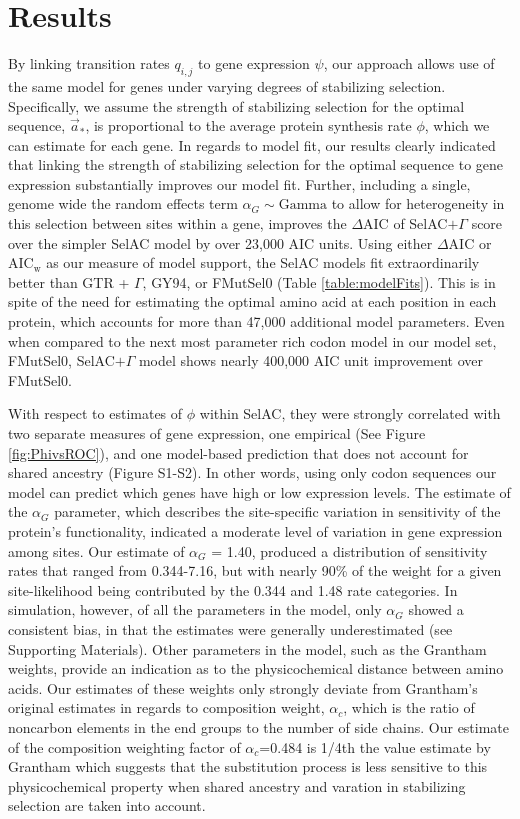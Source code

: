 \documentclass{article}
\newcommand{\DeltaAIC}{\ensuremath{\Delta\text{AIC}}\xspace}
\newcommand{\AICw}{\ensuremath{\text{AIC}_\text{w}}\xspace}
\newcommand{\selac}{SelAC\xspace}
\newcommand{\selacplusgamma}{SelAC$+\Gamma$\xspace}
\newcommand{\alphac}{\ensuremath{\alpha_c}\xspace}
\newcommand{\alphag}{\ensuremath{\alpha_G}\xspace}
\newcommand{\aoptvec}{\ensuremath{\Vec{a}_*}\xspace}
\newcommand{\qij}{\ensuremath{q_{i,j}}\xspace}
\begin{document}
\section*{Results}
By linking transition rates $\qij$ to gene expression $\psi$, our approach allows use of the same model for genes under varying degrees of stabilizing selection.
Specifically, we assume the strength of stabilizing selection for the optimal sequence, \aoptvec, is proportional to the average protein synthesis rate $\phi$, which we can estimate for each gene. 
In regards to model fit, our results clearly indicated that linking the strength of stabilizing selection for the optimal sequence to gene expression substantially improves our model fit.
Further, including a single, genome wide the random effects term $\alphag \sim \text{Gamma}$ to allow for heterogeneity in this selection between sites within a gene, improves the \DeltaAIC of \selacplusgamma score over the simpler \selac model by over 23,000 AIC units.
Using either \DeltaAIC or \AICw as our measure of model support, the \selac models fit extraordinarily better than GTR + $\Gamma$, GY94, or FMutSel0 (Table \ref{table:modelFits}).
This is in spite of the need for estimating the optimal amino acid at each position in each protein, which accounts for  more than 47,000 additional model parameters.
Even when compared to the next most parameter rich codon model in our model set, FMutSel0, \selacplusgamma model shows nearly 400,000 AIC unit improvement over FMutSel0.

With respect to estimates of $\phi$ within \selac, they were strongly correlated with two separate measures of gene expression, one empirical (See Figure \ref{fig:PhivsROC}), and one model-based prediction that does not account for shared ancestry (Figure S1-S2).
In other words, using only codon sequences our model can predict which genes have high or low expression levels.
The estimate of the $\alphag$ parameter, which describes the site-specific variation in sensitivity of the protein's functionality, indicated a moderate level of variation in gene expression among sites.
Our estimate of $\alphag$ = 1.40, produced a distribution of sensitivity rates that ranged from 0.344-7.16, but with nearly 90\% of the weight for a given site-likelihood being contributed by the 0.344 and 1.48 rate categories.
In simulation, however, of all the parameters in the model, only $\alphag$ showed a consistent bias, in that the estimates were generally underestimated (see Supporting Materials).
Other parameters in the model, such as the Grantham weights, provide an indication as to the physicochemical distance between amino acids.
Our estimates of these weights only strongly deviate from Grantham's \citeyear{Grantham1974} original estimates in regards to composition weight, $\alphac$, which is the ratio of noncarbon elements in the end groups to the number of side chains.
Our estimate of the composition weighting factor of $\alphac$=0.484 is 1/4th the value estimate by Grantham which suggests that the substitution process is less sensitive to this physicochemical property when shared ancestry and varation in stabilizing selection are taken into account.
\end{document}
